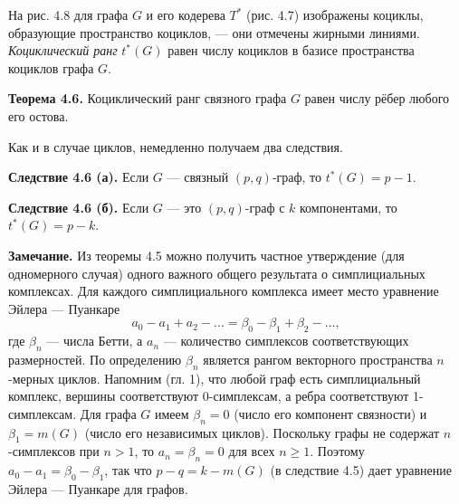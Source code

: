 На рис. 4.8 для графа $G$ и его кодерева $T^*$ (рис. 4.7) изображены коциклы, образующие пространство коциклов, --- они отмечены жирными линиями. \textit{Коциклический ранг} $t^*(G)$ равен числу коциклов в базисе пространства коциклов графа $G$.

\textbf{Теорема 4.6.} Коциклический ранг связного графа $G$ равен числу рёбер любого его остова.

Как и в случае циклов, немедленно получаем два следствия.

\textbf{Следствие 4.6 (а).} Если $G$ --- связный $(p, q)$-граф, то $t^*(G) = p - 1$.

\textbf{Следствие 4.6 (б).} Если $G$ --- это $(p, q)$-граф с $k$ компонентами, то $t^*(G) = p - k$.

\textbf{Замечание.} Из теоремы 4.5 можно получить частное утверждение (для одномерного случая) одного важного общего результата о симплициальных комплексах. Для каждого симплициального комплекса имеет место уравнение Эйлера — Пуанкаре
\[
a_0 - a_1 + a_2 - \ldots = \beta_0 - \beta_1 + \beta_2 - \ldots,
\]
где $\beta_n$ — числа Бетти, а $a_n$ — количество симплексов соответствующих размерностей. По определению $\beta_n$ является рангом векторного пространства $n$-мерных циклов. Напомним (гл. 1), что любой граф есть симплициальный комплекс, вершины соответствуют 0-симплексам, а ребра соответствуют 1-симплексам. Для графа $G$ имеем $\beta_n = 0$ (число его компонент связности) и $\beta_1 = m(G)$ (число его независимых циклов). Поскольку графы не содержат $n$-симплексов при $n > 1$, то $a_n = \beta_n = 0$ для всех $n \geq 1$. Поэтому $a_0 - a_1 = \beta_0 - \beta_1$, так что $p - q = k - m(G)$ (в следствие 4.5) дает уравнение Эйлера — Пуанкаре для графов.

